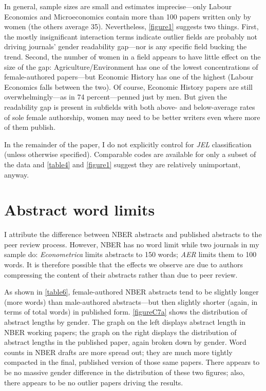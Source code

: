 \begin{appendices}
In general, sample sizes are small and estimates imprecise---only Labour Economics and Microeconomics contain more than 100 papers written only by women (the others average 35). Nevertheless, \autoref{figure1} suggests two things. First, the mostly insignificant interaction terms indicate outlier fields are probably not driving journals' gender readability gap---nor is any specific field bucking the trend. Second, the number of women in a field appears to have little effect on the size of the gap: Agriculture\slash Environment has one of the lowest concentrations of female-authored papers---but Economic History has one of the highest (Labour Economics falls between the two). Of course, Economic History papers are still overwhelmingly---as in 74 percent---penned just by men. But given the readability gap is present in subfields with both above- and below-average rates of sole female authorship, women may need to be better writers even where more of them publish.

In the remainder of the paper, I do not explicitly control for \emph{JEL} classification (unless otherwise specified). Comparable codes are available for only a subset of the data and \autoref{table4} and \autoref{figure1} suggest they are relatively unimportant, anyway.

\section{Abstract word limits}
\label{appendixwordlimits}

I attribute the difference between NBER abstracts and published abstracts to the peer review process. However, NBER has no word limit while two journals in my sample do: \emph{Econometrica} limits abstracts to 150 words; \emph{AER} limits them to 100 words. It is therefore possible that the effects we observe are due to authors compressing the content of their abstracts rather than due to peer review.

As shown in \autoref{table6}, female-authored NBER abstracts tend to be slightly longer (more words) than male-authored abstracts---but then slightly shorter (again, in terms of total words) in published form. \autoref{figureC7a} shows the distribution of abstract lengths by gender. The graph on the left displays abstract length in NBER working papers; the graph on the right displays the distribution of abstract lengths in the published paper, again broken down by gender. Word counts in NBER drafts are more spread out; they are much more tightly compacted in the final, published version of those same papers. There appears to be no massive gender difference in the distribution of these two figures; also, there appears to be no outlier papers driving the results.


\end{appendices}

